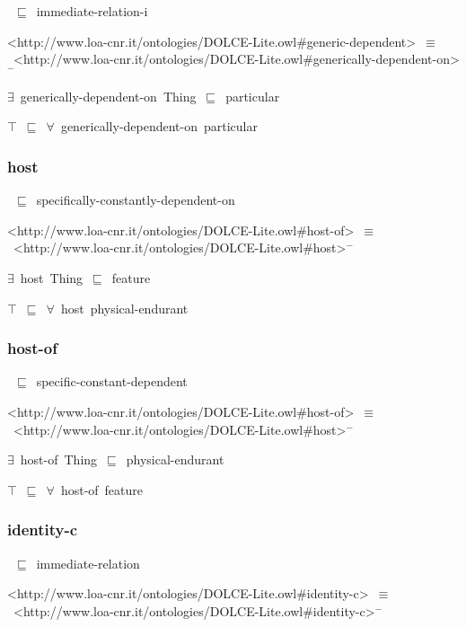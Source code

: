 \documentclass{article}
\begin{document}
~\ensuremath{\sqsubseteq}~immediate-relation-i

<http://www.loa-cnr.it/ontologies/DOLCE-Lite.owl#generic-dependent>~\ensuremath{\equiv}~<http://www.loa-cnr.it/ontologies/DOLCE-Lite.owl#generically-dependent-on>\ensuremath{^-}

\ensuremath{\exists}~generically-dependent-on~Thing~\ensuremath{\sqsubseteq}~particular

\ensuremath{\top}~\ensuremath{\sqsubseteq}~\ensuremath{\forall}~generically-dependent-on~particular

\subsubsection*{host}

~\ensuremath{\sqsubseteq}~specifically-constantly-dependent-on

<http://www.loa-cnr.it/ontologies/DOLCE-Lite.owl#host-of>~\ensuremath{\equiv}~<http://www.loa-cnr.it/ontologies/DOLCE-Lite.owl#host>\ensuremath{^-}

\ensuremath{\exists}~host~Thing~\ensuremath{\sqsubseteq}~feature

\ensuremath{\top}~\ensuremath{\sqsubseteq}~\ensuremath{\forall}~host~physical-endurant

\subsubsection*{host-of}

~\ensuremath{\sqsubseteq}~specific-constant-dependent

<http://www.loa-cnr.it/ontologies/DOLCE-Lite.owl#host-of>~\ensuremath{\equiv}~<http://www.loa-cnr.it/ontologies/DOLCE-Lite.owl#host>\ensuremath{^-}

\ensuremath{\exists}~host-of~Thing~\ensuremath{\sqsubseteq}~physical-endurant

\ensuremath{\top}~\ensuremath{\sqsubseteq}~\ensuremath{\forall}~host-of~feature

\subsubsection*{identity-c}

~\ensuremath{\sqsubseteq}~immediate-relation

<http://www.loa-cnr.it/ontologies/DOLCE-Lite.owl#identity-c>~\ensuremath{\equiv}~<http://www.loa-cnr.it/ontologies/DOLCE-Lite.owl#identity-c>\ensuremath{^-}
\end{document}
